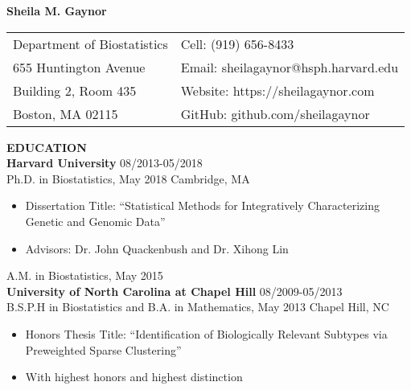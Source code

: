 \documentclass[10pt]{article}
\begin{document}
	
	\renewcommand\labelitemi{\tiny$\bullet$}
	
	\begin{center}
		\textbf{\Large Sheila M. Gaynor}\\
		\vspace{0.1cm}
		\begin{table}[H]
			\centering
			\begin{tabular}{@{}p{6cm}@{}@{}p{6cm}@{}}				
				Department of Biostatistics  & Cell: (919) 656-8433                \\
				655 Huntington Avenue  &  Email: sheilagaynor@hsph.harvard.edu               \\
				 Building 2, Room 435     & Website: https://sheilagaynor.com   \\
				Boston, MA 02115             & GitHub: github.com/sheilagaynor   \\     
			\end{tabular}
		\end{table}
	\end{center}

\vspace{0.3cm}
{ \bf EDUCATION} \hrulefill \\

\textbf{Harvard University} \hfill 08/2013-05/2018\\
\indent Ph.D. in Biostatistics, May 2018  \hfill Cambridge, MA
\begin{itemize}
	\item Dissertation Title: “Statistical Methods for Integratively Characterizing Genetic and Genomic Data”
	\item Advisors:  Dr. John Quackenbush and Dr. Xihong Lin
\end{itemize}

\indent A.M. in Biostatistics, May 2015\\

\textbf{University of North Carolina at Chapel Hill} \hfill 08/2009-05/2013\\
\indent B.S.P.H in Biostatistics and  B.A. in Mathematics, May 2013   \hfill Chapel Hill, NC
\begin{itemize}
	\item Honors Thesis Title: “Identification of Biologically Relevant Subtypes via Preweighted Sparse Clustering”
	\item With highest honors and highest distinction\\
\end{itemize}
\end{document}
